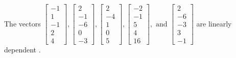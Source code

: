 \begin{exercise}
\begin{exerciseStatement}
  \end{exerciseStatement}
  \begin{exerciseAnswer}
   The vectors \(\left[\begin{array}{r}
-1 \\
1 \\
-1 \\
2 \\
4
\end{array}\right] , \left[\begin{array}{r}
2 \\
-1 \\
-6 \\
0 \\
-3
\end{array}\right] , \left[\begin{array}{r}
2 \\
-4 \\
1 \\
0 \\
5
\end{array}\right] , \left[\begin{array}{r}
-2 \\
-1 \\
5 \\
4 \\
16
\end{array}\right] , \text{ and } \left[\begin{array}{r}
2 \\
-6 \\
-3 \\
3 \\
-1
\end{array}\right]\) are 
  	 linearly dependent  .
  


  \end{exerciseAnswer}
\end{exercise}